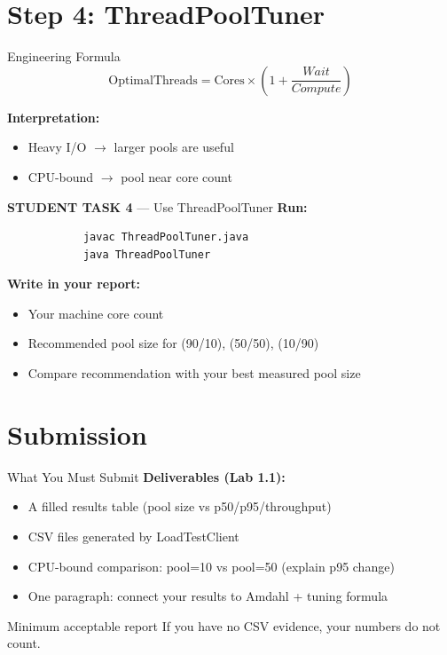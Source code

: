 \documentclass[11pt]{beamer}
\begin{document}
	\section{Step 4: ThreadPoolTuner}
	
	\begin{frame}{Engineering Formula}
		\[
		\text{OptimalThreads}
		=
		\text{Cores}
		\times
		\left(1 + \frac{Wait}{Compute}\right)
		\]
		
		\textbf{Interpretation:}
		\begin{itemize}
			\item Heavy I/O $\rightarrow$ larger pools are useful
			\item CPU-bound $\rightarrow$ pool near core count
		\end{itemize}
	\end{frame}
	
	\begin{frame}[fragile]{\textbf{STUDENT TASK 4} --- Use ThreadPoolTuner}
		\textbf{Run:}
		\begin{lstlisting}
			javac ThreadPoolTuner.java
			java ThreadPoolTuner
		\end{lstlisting}
		

		
		\textbf{Write in your report:}
		\begin{itemize}
			\item Your machine core count
			\item Recommended pool size for (90/10), (50/50), (10/90)
			\item Compare recommendation with your best measured pool size
		\end{itemize}
	\end{frame}
	
	\section{Submission}
	
	\begin{frame}{What You Must Submit}
		\textbf{Deliverables (Lab 1.1):}
		\begin{itemize}
			\item A filled results table (pool size vs p50/p95/throughput)
			\item CSV files generated by LoadTestClient
			\item CPU-bound comparison: pool=10 vs pool=50 (explain p95 change)
			\item One paragraph: connect your results to Amdahl + tuning formula
		\end{itemize}
		
		\begin{alertblock}{Minimum acceptable report}
			If you have no CSV evidence, your numbers do not count.
		\end{alertblock}
	\end{frame}
	
\end{document}
